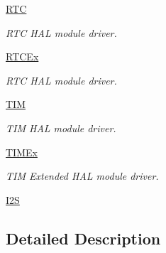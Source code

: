 \begin{DoxyCompactItemize}
\hyperlink{group___r_t_c}{R\+TC}
\begin{DoxyCompactList}\small\item\em R\+TC H\+AL module driver. \end{DoxyCompactList}\item 
\hyperlink{group___r_t_c_ex}{R\+T\+C\+Ex}
\begin{DoxyCompactList}\small\item\em R\+TC H\+AL module driver. \end{DoxyCompactList}\item 
\hyperlink{group___t_i_m}{T\+IM}
\begin{DoxyCompactList}\small\item\em T\+IM H\+AL module driver. \end{DoxyCompactList}\item 
\hyperlink{group___t_i_m_ex}{T\+I\+M\+Ex}
\begin{DoxyCompactList}\small\item\em T\+IM Extended H\+AL module driver. \end{DoxyCompactList}\item 
\hyperlink{group___i2_s}{I2S}
\end{DoxyCompactItemize}


\subsection{Detailed Description}
